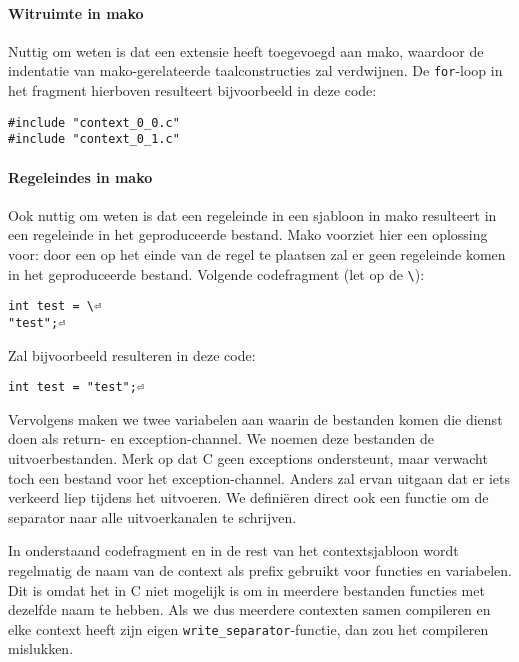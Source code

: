 \paragraph*{Witruimte in mako}

Nuttig om weten is dat \tested{} een extensie heeft toegevoegd aan mako, waardoor de indentatie van mako-gerelateerde taalconstructies zal verdwijnen.
De \texttt{for}-loop in het fragment hierboven resulteert bijvoorbeeld in deze code:

\begin{verbatim}
#include "context_0_0.c"
#include "context_0_1.c"
\end{verbatim}

\paragraph*{Regeleindes in mako}

Ook nuttig om weten is dat een regeleinde in een sjabloon in mako resulteert in een regeleinde in het geproduceerde bestand.
Mako voorziet hier een oplossing voor: door een  op het einde van de regel te plaatsen zal er geen regeleinde komen in het geproduceerde bestand.
Volgende codefragment (let op de \texttt{\textbackslash}):

\begin{verbatim}
int test = \⏎
"test";⏎
\end{verbatim}

Zal bijvoorbeeld resulteren in deze code:

\begin{verbatim}
int test = "test";⏎
\end{verbatim}

Vervolgens maken we twee variabelen aan waarin de bestanden komen die dienst doen als return- en exception-channel.
We noemen deze bestanden de uitvoerbestanden.
Merk op dat C geen exceptions ondersteunt, maar \tested{} verwacht toch een bestand voor het exception-channel.
Anders zal \tested{} ervan uitgaan dat er iets verkeerd liep tijdens het uitvoeren.
We definiëren direct ook een functie om de separator naar alle uitvoerkanalen te schrijven.

In onderstaand codefragment en in de rest van het contextsjabloon wordt regelmatig de naam van de context als prefix gebruikt voor functies en variabelen.
Dit is omdat het in C niet mogelijk is om in meerdere bestanden functies met dezelfde naam te hebben.
Als we dus meerdere contexten samen compileren en elke context heeft zijn eigen \texttt{write\_separator}-functie, dan zou het compileren mislukken.


